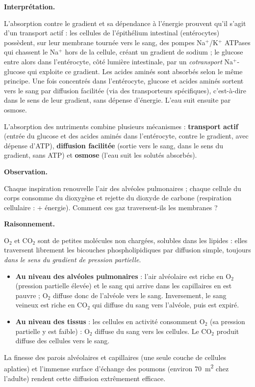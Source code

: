 \documentclass[11pt]{article}
\newcommand{\cle}[1]{{\popxbold\color{popdark}#1}}
\newcounter{popsec}
\newcounter{popsub}
\newcommand{\courssub}[1]{%
  \stepcounter{popsub}%
  \par\vspace{9pt}\noindent{\popxbold\fontsize{11.5}{13}\selectfont\color{popink}{\color{poporange}\thepopsec.\thepopsub}\hspace{6pt}#1}\par\nopagebreak\vspace{4pt}
}
\begin{document}
\textbf{Interprétation.}\par
L'absorption contre le gradient et sa dépendance à l'énergie prouvent qu'il s'agit d'un \cle{transport actif} : les cellules de l'épithélium intestinal (entérocytes) possèdent, sur leur membrane tournée vers le sang, des pompes Na$^+$/K$^+$ ATPases qui chassent le Na$^+$ hors de la cellule, créant un gradient de sodium ; le glucose entre alors dans l'entérocyte, côté lumière intestinale, par un \emph{cotransport} Na$^+$-glucose qui exploite ce gradient. Les acides aminés sont absorbés selon le même principe. Une fois concentrés dans l'entérocyte, glucose et acides aminés sortent vers le sang par \cle{diffusion facilitée} (via des transporteurs spécifiques), c'est-à-dire dans le sens de leur gradient, sans dépense d'énergie. L'eau suit ensuite par \cle{osmose}.

\begin{aretenir}
L'absorption des nutriments combine plusieurs mécanismes : \textbf{transport actif} (entrée du glucose et des acides aminés dans l'entérocyte, contre le gradient, avec dépense d'ATP), \textbf{diffusion facilitée} (sortie vers le sang, dans le sens du gradient, sans ATP) et \textbf{osmose} (l'eau suit les solutés absorbés).
\end{aretenir}

\courssub{La respiration : les échanges de O$_2$ et CO$_2$}

\textbf{Observation.}\par
Chaque inspiration renouvelle l'air des alvéoles pulmonaires ; chaque cellule du corps consomme du dioxygène et rejette du dioxyde de carbone (respiration cellulaire :  + énergie). Comment ces gaz traversent-ils les membranes ?

\textbf{Raisonnement.}\par
O$_2$ et CO$_2$ sont de petites molécules non chargées, solubles dans les lipides : elles traversent librement les bicouches phospholipidiques par \cle{diffusion simple}, toujours \emph{dans le sens du gradient de pression partielle}.
\begin{itemize}
\item \textbf{Au niveau des alvéoles pulmonaires} : l'air alvéolaire est riche en O$_2$ (pression partielle élevée) et le sang qui arrive dans les capillaires en est pauvre ; O$_2$ diffuse donc de l'alvéole vers le sang. Inversement, le sang veineux est riche en CO$_2$ qui diffuse du sang vers l'alvéole, puis est expiré.
\item \textbf{Au niveau des tissus} : les cellules en activité consomment O$_2$ (sa pression partielle y est faible) : O$_2$ diffuse du sang vers les cellules. Le CO$_2$ produit diffuse des cellules vers le sang.
\end{itemize}
La finesse des parois alvéolaires et capillaires (une seule couche de cellules aplaties) et l'immense surface d'échange des poumons (environ \SI{70}{m^2} chez l'adulte) rendent cette diffusion extrêmement efficace.
\end{document}
